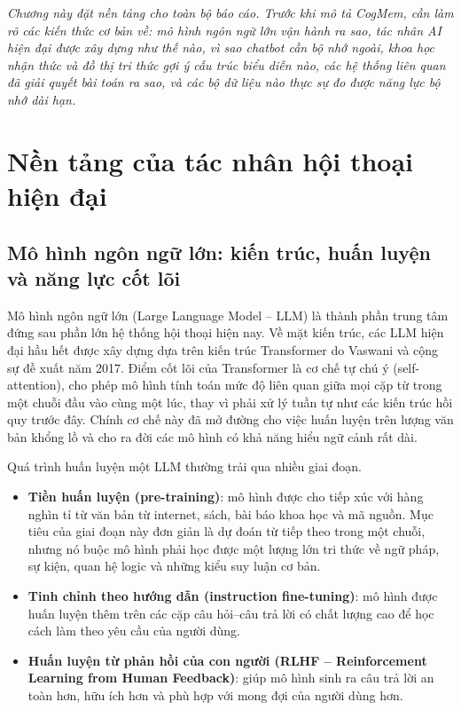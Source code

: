 \documentclass[../main.tex]{subfiles}
\begin{document}
\textit{Chương này đặt nền tảng cho toàn bộ báo cáo. Trước khi mô tả CogMem, cần làm rõ các kiến thức cơ bản về: mô hình ngôn ngữ lớn vận hành ra sao, tác nhân AI hiện đại được xây dựng như thế nào, vì sao chatbot cần bộ nhớ ngoài, khoa học nhận thức và đồ thị tri thức gợi ý cấu trúc biểu diễn nào, các hệ thống liên quan đã giải quyết bài toán ra sao, và các bộ dữ liệu nào thực sự đo được năng lực bộ nhớ dài hạn.}

\section{Nền tảng của tác nhân hội thoại hiện đại}

\subsection{Mô hình ngôn ngữ lớn: kiến trúc, huấn luyện và năng lực cốt lõi}

Mô hình ngôn ngữ lớn (Large Language Model -- LLM) là thành phần trung tâm đứng sau phần lớn hệ thống hội thoại hiện nay. Về mặt kiến trúc, các LLM hiện đại hầu hết được xây dựng dựa trên kiến trúc Transformer do Vaswani và cộng sự đề xuất năm 2017. Điểm cốt lõi của Transformer là cơ chế tự chú ý (self-attention), cho phép mô hình tính toán mức độ liên quan giữa mọi cặp từ trong một chuỗi đầu vào cùng một lúc, thay vì phải xử lý tuần tự như các kiến trúc hồi quy trước đây. Chính cơ chế này đã mở đường cho việc huấn luyện trên lượng văn bản khổng lồ và cho ra đời các mô hình có khả năng hiểu ngữ cảnh rất dài.

Quá trình huấn luyện một LLM thường trải qua nhiều giai đoạn. 

\begin{itemize}
    \item \textbf{Tiền huấn luyện (pre-training)}: mô hình được cho tiếp xúc với hàng nghìn tỉ từ văn bản từ internet, sách, bài báo khoa học và mã nguồn. Mục tiêu của giai đoạn này đơn giản là dự đoán từ tiếp theo trong một chuỗi, nhưng nó buộc mô hình phải học được một lượng lớn tri thức về ngữ pháp, sự kiện, quan hệ logic và những kiểu suy luận cơ bản.
    \item \textbf{Tinh chỉnh theo hướng dẫn (instruction fine-tuning)}: mô hình được huấn luyện thêm trên các cặp câu hỏi--câu trả lời có chất lượng cao để học cách làm theo yêu cầu của người dùng.
    \item \textbf{Huấn luyện từ phản hồi của con người (RLHF -- Reinforcement Learning from Human Feedback)}: giúp mô hình sinh ra câu trả lời an toàn hơn, hữu ích hơn và phù hợp với mong đợi của người dùng hơn.
\end{itemize}
\end{document}
